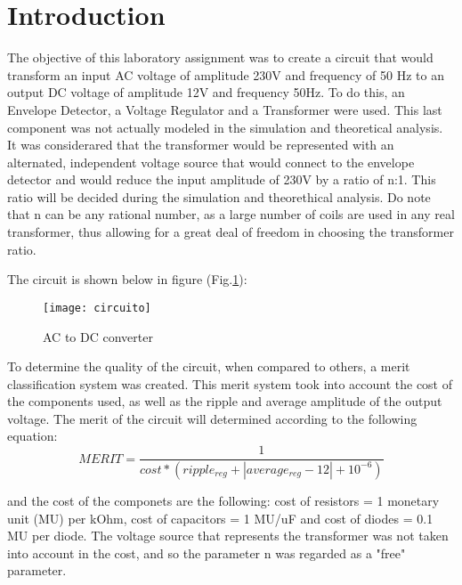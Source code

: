\section{Introduction}
\label{sec:introduction}


\par The objective of this laboratory assignment was to create a circuit that would transform an input AC voltage of amplitude 230V and frequency of 50 Hz to an output DC voltage of amplitude 12V and frequency 50Hz. To do this, an Envelope Detector, a Voltage Regulator and a Transformer were used. This last component was not actually modeled in the simulation and theoretical analysis. It was considerared that the transformer would be represented with an alternated, independent voltage source that would connect to the envelope detector and would reduce the input amplitude of 230V by a ratio of n:1. This ratio will be decided during the simulation and theorethical analysis. Do note that n can be any rational number, as a large number of coils are used in any real transformer, thus allowing for a great deal of freedom in choosing the transformer ratio.\par

The circuit is shown below in figure (Fig.\ref{fig:circuito}): \par

\begin{figure}[H]
\centering
\texttt{[image: circuito]}
\caption{AC to DC converter}
\label{fig:circuito}
\end{figure}


To determine the quality of the circuit, when compared to others, a merit classification system was created. This merit system took into account the cost of the components used, as well as the ripple and average amplitude of the output voltage. The merit of the circuit will determined according to the following equation: 
\begin {equation}
	 MERIT = \frac{1}{cost*(ripple_{reg} + |average_{reg} - 12| + 10^{-6})}   	
	\label{eq:i1}
\end{equation}

and the cost of the componets are the following: cost of resistors = 1 monetary unit (MU) per kOhm, cost of capacitors = 1 MU/uF
and cost of diodes = 0.1 MU per diode. The voltage source that represents the transformer was not taken into account in the cost, and so the parameter n was regarded as a "free" parameter.


